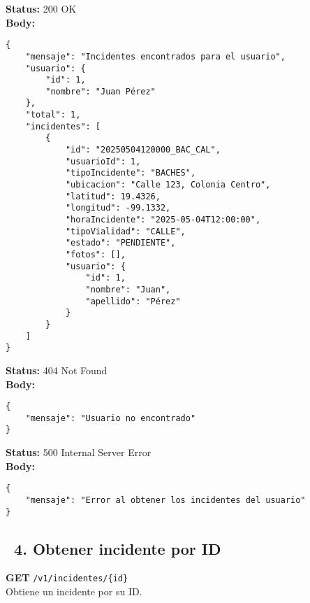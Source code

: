 \begin{tcolorbox}[response]
    \textbf{Status:} 200 OK\\
    \textbf{Body:}
    \begin{verbatim}
{
    "mensaje": "Incidentes encontrados para el usuario",
    "usuario": {
        "id": 1,
        "nombre": "Juan Pérez"
    },
    "total": 1,
    "incidentes": [
        {
            "id": "20250504120000_BAC_CAL",
            "usuarioId": 1,
            "tipoIncidente": "BACHES",
            "ubicacion": "Calle 123, Colonia Centro",
            "latitud": 19.4326,
            "longitud": -99.1332,
            "horaIncidente": "2025-05-04T12:00:00",
            "tipoVialidad": "CALLE",
            "estado": "PENDIENTE",
            "fotos": [],
            "usuario": {
                "id": 1,
                "nombre": "Juan",
                "apellido": "Pérez"
            }
        }
    ]
}
    \end{verbatim}
\end{tcolorbox}

\begin{tcolorbox}[response]
    \textbf{Status:} 404 Not Found\\
    \textbf{Body:}
    \begin{verbatim}
{
    "mensaje": "Usuario no encontrado"
}
    \end{verbatim}
\end{tcolorbox}

\begin{tcolorbox}[response]
    \textbf{Status:} 500 Internal Server Error\\
    \textbf{Body:}
    \begin{verbatim}
{
    "mensaje": "Error al obtener los incidentes del usuario"
}
    \end{verbatim}
\end{tcolorbox}

\subsection*{\faServer\ 4. Obtener incidente por ID}
\begin{tcolorbox}[endpoint]
    \textbf{GET} \texttt{/v1/incidentes/\{id\}}\\
    Obtiene un incidente por su ID.
\end{tcolorbox}

